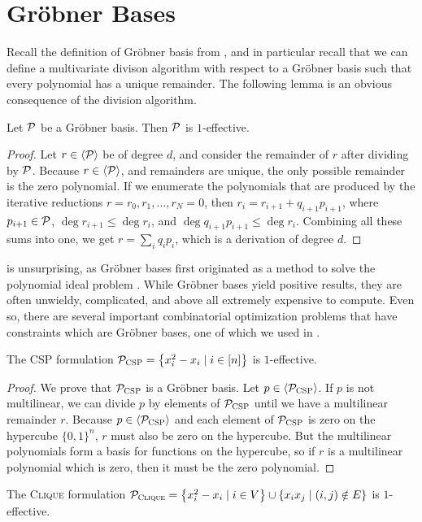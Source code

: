 \section{Gr\"obner Bases}
Recall the definition of Gr\"obner basis from , and in particular recall that we can define a multivariate divison algorithm with respect to a Gr\"obner basis such that every polynomial has a unique remainder. The following lemma is an obvious consequence of the division algorithm.
\begin{lemma}\label{lem:grobnereffective}
Let $\mathcal P$ be a Gr\"obner basis. Then $\mathcal P$ is $1$-effective.
\end{lemma}
\begin{proof}
Let $r \in \langle \mathcal P \rangle$ be of degree $d$, and consider the remainder of $r$ after dividing by $\mathcal P$. Because $r \in \langle \mathcal P \rangle$, and remainders are unique, the only possible remainder is the zero polynomial. If we enumerate the polynomials that are produced by the iterative reductions $r = r_0, r_1, \dots, r_N = 0$, then 
$r_i = r_{i+1} + q_{i+1}p_{i+1}$, where $p_{i+1} \in \mathcal P$, $\deg r_{i+1} \leq \deg r_i$, and $\deg q_{i+1}p_{i+1} \leq \deg r_i$. Combining all these sums into one, we get
$r = \sum_i q_i p_i$, which is a derivation of degree $d$. 
\end{proof}
 is unsurprising, as Gr\"obner bases first originated as a method to solve the polynomial ideal problem \cite{Buch65}. 
While Gr\"obner bases yield positive results, they are often unwieldy, complicated, and above all extremely expensive to compute. 
Even so, there are several important combinatorial optimization problems that have constraints which are Gr\"obner bases, one of which we used in .
\begin{corollary}\label{cor:csp-effective}
The \textsc{CSP} formulation $\mathcal P_{\textsc{CSP}} = \left\{x_i^2 - x_i \mid i \in [n]\right\}$ is $1$-effective.
\end{corollary}
\begin{proof}
We prove that $\mathcal P_{\textsc{CSP}}$ is a Gr\"obner basis. 
Let $p \in \langle \mathcal P_{\textsc{CSP}} \rangle$. If $p$ is not multilinear, we can divide $p$ by elements of $\mathcal P_{\textsc{CSP}}$ until we have a multilinear remainder $r$. Because 
$p \in \langle \mathcal P_{\textsc{CSP}} \rangle$ and each element of $\mathcal P_{\textsc{CSP}}$ is zero on the hypercube $\{0, 1\}^n$, $r$ must also be zero on the hypercube. But the multilinear
polynomials form a basis for functions on the hypercube, so if $r$ is a multilinear polynomial which is zero, then it must be the zero polynomial. 
\end{proof}
\begin{corollary}
The \textsc{Clique} formulation $\mathcal P_{\textsc{Clique}} = \left\{x_i^2 - x_i \mid i \in V\right\} \cup \left\{x_ix_j \mid (i,j) \notin E\right\}$ is $1$-effective.
\end{corollary}
